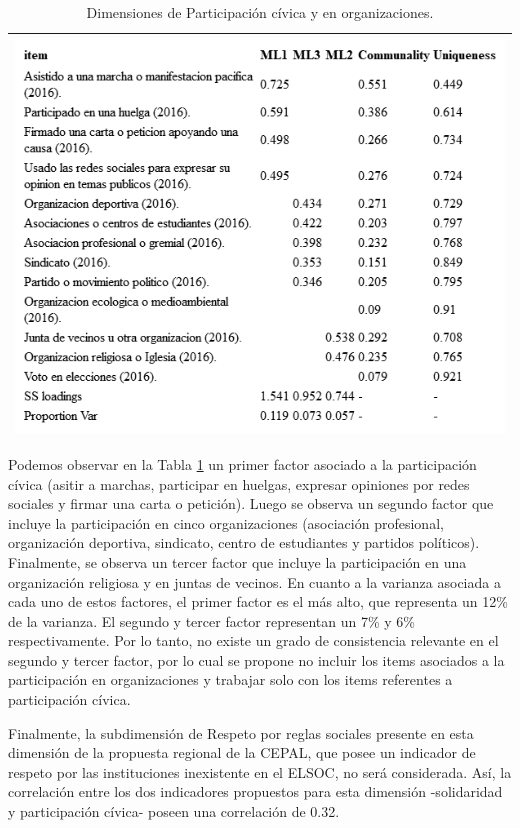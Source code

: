 \documentclass[
  12pt,
]{book}
\begin{document}
\begin{longtable}[]{@{}l@{}}
\caption{\label{tab:participacion-fa}Dimensiones de Participación cívica y en organizaciones.}\tabularnewline
\toprule
\endhead
\includegraphics[width=8.33333in,height=\textheight]{output/tables/participacion_fa.png}\tabularnewline
\bottomrule
\end{longtable}

Podemos observar en la Tabla \ref{tab:participacion-fa} un primer factor asociado a la participación cívica (asitir a marchas, participar en huelgas, expresar opiniones por redes sociales y firmar una carta o petición). Luego se observa un segundo factor que incluye la participación en cinco organizaciones (asociación profesional, organización deportiva, sindicato, centro de estudiantes y partidos políticos). Finalmente, se observa un tercer factor que incluye la participación en una organización religiosa y en juntas de vecinos. En cuanto a la varianza asociada a cada uno de estos factores, el primer factor es el más alto, que representa un 12\% de la varianza. El segundo y tercer factor representan un 7\% y 6\% respectivamente. Por lo tanto, no existe un grado de consistencia relevante en el segundo y tercer factor, por lo cual se propone no incluir los items asociados a la participación en organizaciones y trabajar solo con los items referentes a participación cívica.

Finalmente, la subdimensión de Respeto por reglas sociales presente en esta dimensión de la propuesta regional de la CEPAL, que posee un indicador de respeto por las instituciones inexistente en el ELSOC, no será considerada. Así, la correlación entre los dos indicadores propuestos para esta dimensión -solidaridad y participación cívica- poseen una correlación de 0.32.
\end{document}
